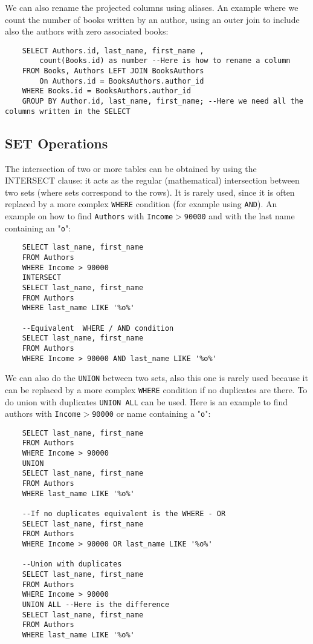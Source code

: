 \documentclass[a4page, 11pt]{article}
\theoremstyle{definition}
\begin{document}
We can also rename the projected columns using aliases. An example where we count the number of books written by an author, using an outer join to include also the authors with zero associated books:
\begin{lstlisting}
	SELECT Authors.id, last_name, first_name ,
		count(Books.id) as number --Here is how to rename a column
	FROM Books, Authors LEFT JOIN BooksAuthors
		On Authors.id = BooksAuthors.author_id
	WHERE Books.id = BooksAuthors.author_id
	GROUP BY Author.id, last_name, first_name; --Here we need all the columns written in the SELECT
\end{lstlisting}
\subsection{SET Operations}
The intersection of two or more tables can be obtained by using the INTERSECT clause: it acts as the regular (mathematical) intersection between two sets (where sets correspond to the rows). 
It is rarely used, since it is often replaced by a more complex \texttt{WHERE} condition (for example using \texttt{AND}). 
An example on how to find \texttt{Authors} with \texttt{Income$>$90000} and with the last name containing an "\texttt{o}":
\begin{lstlisting}
	SELECT last_name, first_name
	FROM Authors
	WHERE Income > 90000
	INTERSECT 
	SELECT last_name, first_name
	FROM Authors
	WHERE last_name LIKE '%o%' 
	
	--Equivalent  WHERE / AND condition
	SELECT last_name, first_name
	FROM Authors
	WHERE Income > 90000 AND last_name LIKE '%o%'
\end{lstlisting}
We can also do the \texttt{UNION} between two sets, also this one is rarely used because it can be replaced by a more complex \texttt{WHERE} condition if no duplicates are there. To do union with duplicates \texttt{UNION ALL} can be used. 
Here is an example to find authors with \texttt{Income$>$90000} or name containing a "\texttt{o}":
\begin{lstlisting}
	SELECT last_name, first_name
	FROM Authors
	WHERE Income > 90000
	UNION 
	SELECT last_name, first_name
	FROM Authors
	WHERE last_name LIKE '%o%' 
	
	--If no duplicates equivalent is the WHERE - OR
	SELECT last_name, first_name
	FROM Authors
	WHERE Income > 90000 OR last_name LIKE '%o%'
	
	--Union with duplicates
	SELECT last_name, first_name
	FROM Authors
	WHERE Income > 90000
	UNION ALL --Here is the difference
	SELECT last_name, first_name
	FROM Authors
	WHERE last_name LIKE '%o%' 
\end{lstlisting}
\end{document}
